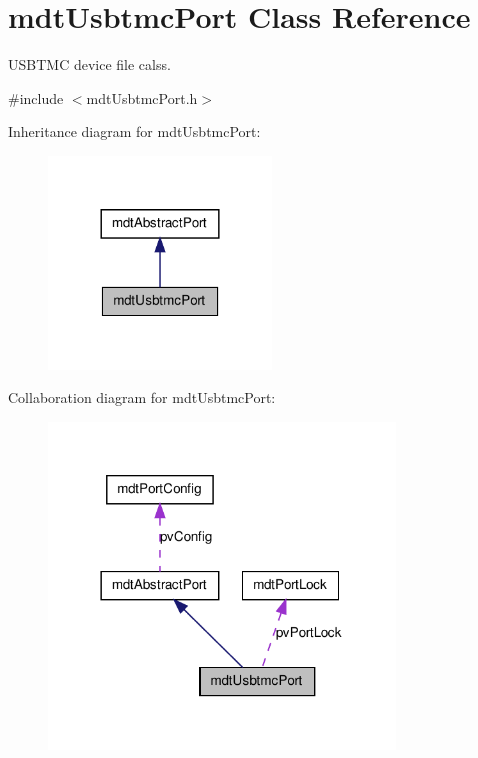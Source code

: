 \hypertarget{classmdt_usbtmc_port}{
\section{mdtUsbtmcPort Class Reference}
\label{classmdt_usbtmc_port}
}


USBTMC device file calss.  




{\ttfamily \#include $<$mdtUsbtmcPort.h$>$}



Inheritance diagram for mdtUsbtmcPort:\nopagebreak
\begin{figure}[H]
\begin{center}
\leavevmode
\includegraphics[width=168pt]{classmdt_usbtmc_port__inherit__graph}
\end{center}
\end{figure}


Collaboration diagram for mdtUsbtmcPort:\nopagebreak
\begin{figure}[H]
\begin{center}
\leavevmode
\includegraphics[width=261pt]{classmdt_usbtmc_port__coll__graph}
\end{center}
\end{figure}
